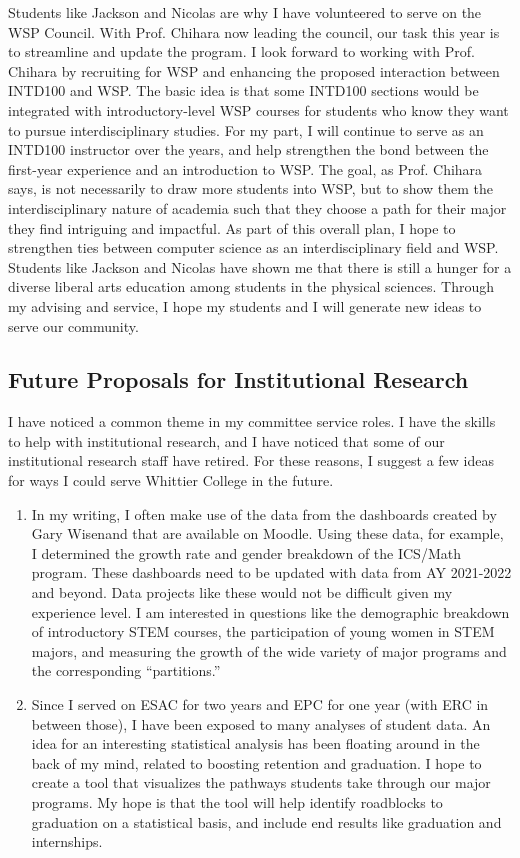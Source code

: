 \documentclass[../../../main.tex]{subfiles}
\begin{document}
Students like Jackson and Nicolas are why I have volunteered to serve on the WSP Council.  With Prof. Chihara now leading the council, our task this year is to streamline and update the program.  I look forward to working with Prof. Chihara by recruiting for WSP and enhancing the proposed interaction between INTD100 and WSP.  The basic idea is that some INTD100 sections would be integrated with introductory-level WSP courses for students who know they want to pursue interdisciplinary studies.  For my part, I will continue to serve as an INTD100 instructor over the years, and help strengthen the bond between the first-year experience and an introduction to WSP.  The goal, as Prof. Chihara says, is not necessarily to draw more students into WSP, but to show them the interdisciplinary nature of academia such that they choose a path for their major they find intriguing and impactful.  As part of this overall plan, I hope to strengthen ties between computer science as an interdisciplinary field and WSP.  Students like Jackson and Nicolas have shown me that there is still a hunger for a diverse liberal arts education among students in the physical sciences.  Through my advising and service, I hope my students and I will generate new ideas to serve our community.

\subsection{Future Proposals for Institutional Research}

I have noticed a common theme in my committee service roles.  I have the skills to help with institutional research, and I have noticed that some of our institutional research staff have retired.  For these reasons, I suggest a few ideas for ways I could serve Whittier College in the future.
\begin{enumerate}
\item In my writing, I often make use of the data from the dashboards created by Gary Wisenand that are available on Moodle.  Using these data, for example, I determined the growth rate and gender breakdown of the ICS/Math program.  These dashboards need to be updated with data from AY 2021-2022 and beyond.  Data projects like these would not be difficult given my experience level.  I am interested in questions like the demographic breakdown of introductory STEM courses, the participation of young women in STEM majors, and measuring the growth of the wide variety of major programs and the corresponding ``partitions.''
\item Since I served on ESAC for two years and EPC for one year (with ERC in between those), I have been exposed to many analyses of student data.  An idea for an interesting statistical analysis has been floating around in the back of my mind, related to boosting retention and graduation.  I hope to create a tool that visualizes the pathways students take through our major programs.  My hope is that the tool will help identify roadblocks to graduation on a statistical basis, and include end results like graduation and internships.
\end{enumerate}
\end{document}

